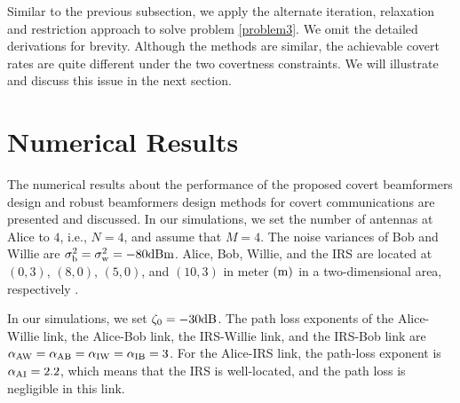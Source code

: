 \documentclass[10pt,journal,letterpaper,twocolumn,twoside]{IEEEtran} %
\begin{document}
Similar to the previous subsection, we  apply the alternate iteration, relaxation and restriction approach to solve problem \eqref{problem3}. We omit the detailed derivations for brevity. Although the methods are similar, the achievable covert rates  are quite different under the two covertness constraints. We will illustrate and discuss this issue in   the next section.
%

%
%
\section{Numerical Results}
%
%
%
The numerical results  about the performance of the proposed
covert beamformers design and  robust beamformers design methods for covert communications are presented and discussed.
In our simulations, we set  the number of   antennas  at  Alice to $4$, i.e., $N=4$, and assume that  $M = 4$. The noise
variances of Bob and Willie are $\sigma _{\rm{b}}^2=\sigma _{\rm{w}}^2=-80\rm{dBm}$.
Alice, Bob, Willie,
and the IRS are located at $\left( {0,3} \right)$, $\left( {8,0} \right)$, $\left( {5,0} \right)$, and
$\left( {10,3} \right)$ in meter $\left( {\rm{m}} \right)$ in a two-dimensional area, respectively \cite{Hong20Artificial,Hossain20Intelligent}.

In our simulations, we set ${\zeta _0} =  - 30{\rm{dB}}$.
The path loss exponents of the Alice-Willie link, the Alice-Bob link, the IRS-Willie link, and the IRS-Bob link are ${\alpha _{{\rm{AW}}}} ={\alpha _{{\rm{AB}}}} ={\alpha _{{\rm{IW}}}} = {\alpha _{{\rm{IB}}}} = 3$. For the Alice-IRS link, the
path-loss exponent is  ${\alpha _{{\rm{AI}}}} = 2.2$, which means that the IRS is well-located, and the path loss is negligible in this link.
\end{document}
